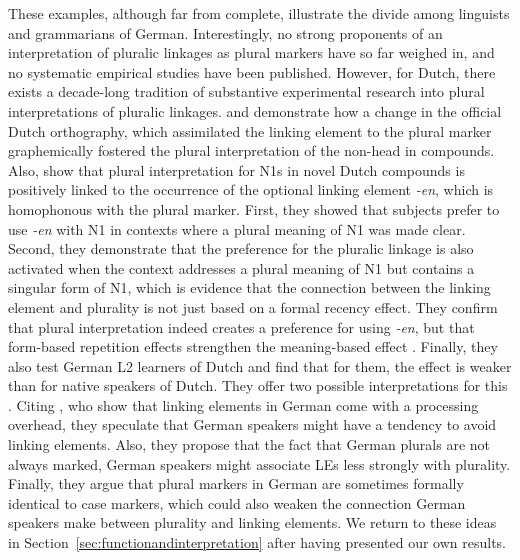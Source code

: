 These examples, although far from complete, illustrate the divide among linguists and grammarians of German.
Interestingly, no strong proponents of an interpretation of pluralic linkages as plural markers have so far weighed in, and no systematic empirical studies have been published.
However, for Dutch, there exists a decade-long tradition of substantive experimental research into plural interpretations of pluralic linkages.
\textcite{SchreuderEa1998} and \textcite{BangaEa2012} demonstrate how a change in the official Dutch orthography, which assimilated the linking element to the plural marker graphemically fostered the plural interpretation of the non-head in compounds.
Also, \textcite{BangaEa2013a} show that plural interpretation for N1s in novel Dutch compounds is positively linked to the occurrence of the optional linking element \textit{-en}, which is homophonous with the plural marker.
First, they showed that subjects prefer to use \textit{-en} with N1 in contexts where a plural meaning of N1 was made clear.
Second, they demonstrate that the preference for the pluralic linkage is also activated when the context addresses a plural meaning of N1 but contains a singular form of N1, which is evidence that the connection between the linking element and plurality is not just based on a formal recency effect.
They confirm that plural interpretation indeed creates a preference for using \textit{-en}, but that form-based repetition effects strengthen the meaning-based effect \parencite[45]{BangaEa2013a}.
Finally, they also test German L2 learners of Dutch and find that for them, the effect is weaker than for native speakers of Dutch.
They offer two possible interpretations for this \parencite[45--47]{BangaEa2013a}.
Citing \textcite{LibbenEa2002}, who show that linking elements in German come with a processing overhead, they speculate that German speakers might have a tendency to avoid linking elements.
Also, they propose that the fact that German plurals are not always marked, German speakers might associate LEs less strongly with plurality.
Finally, they argue that plural markers in German are sometimes formally identical to case markers, which could also weaken the connection German speakers make between plurality and linking elements.
We return to these ideas in Section~\ref{sec:functionandinterpretation} after having presented our own results.

